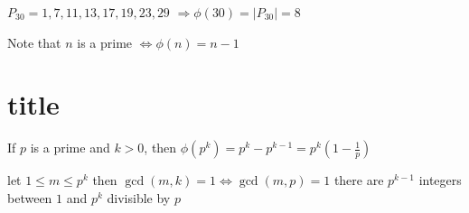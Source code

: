 \begin{eg}
    $P_{30} = {1, 7, 11, 13, 17, 19, 23, 29}$
    $\Rightarrow \phi(30) = |P_{30}| = 8$

    Note that $n$ is a prime $\Leftrightarrow \phi(n) = n-1$
\end{eg}

\setcounter{section}{0}
\section{title}
\begin{theorem}
    If $p$ is a prime and $k > 0$, then
    $\phi(p^k) = p^k - p^{k-1} = p^k (1 - \frac{1}{p})$
\end{theorem}


\begin{explanation}
    let $1 \leq m \leq p^k$ then $\gcd(m, k) = 1 \Leftrightarrow \gcd(m, p) = 1$
    there are $p^{k-1}$ integers between $1$ and $p^k$ divisible by $p$
\end{explanation}

